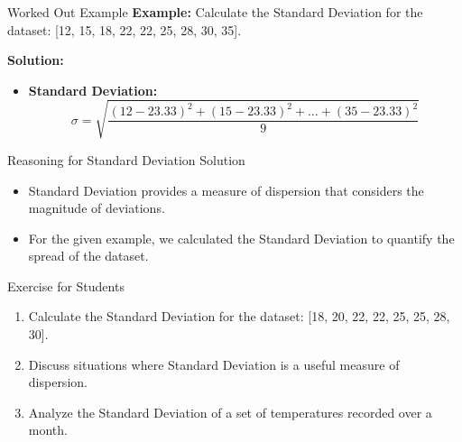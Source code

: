 \begin{frame}{Worked Out Example}
  \textbf{Example:} Calculate the Standard Deviation for the dataset: [12, 15, 18, 22, 22, 25, 28, 30, 35].

  \textbf{Solution:}
  \begin{itemize}
    \item \textbf{Standard Deviation:} \[ \sigma = \sqrt{\frac{(12-23.33)^2 + (15-23.33)^2 + \ldots + (35-23.33)^2}{9}} \]
  \end{itemize}
\end{frame}

\begin{frame}{Reasoning for Standard Deviation Solution}
  \begin{itemize}
    \item Standard Deviation provides a measure of dispersion that considers the magnitude of deviations.
    \item For the given example, we calculated the Standard Deviation to quantify the spread of the dataset.
  \end{itemize}
\end{frame}

\begin{frame}{Exercise for Students}
  \begin{enumerate}
    \item Calculate the Standard Deviation for the dataset: [18, 20, 22, 22, 25, 25, 28, 30].
    \item Discuss situations where Standard Deviation is a useful measure of dispersion.
    \item Analyze the Standard Deviation of a set of temperatures recorded over a month.
  \end{enumerate}
\end{frame}
